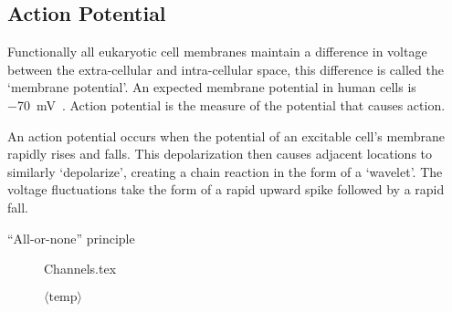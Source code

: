 \documentclass[../../Orator]{subfiles}
\begin{document}
\endgroup

\subsection{Action Potential}

Functionally all eukaryotic cell membranes maintain a difference in voltage between the extra-cellular and intra-cellular space, this difference is called the `membrane potential'. An expected membrane potential in human cells is \qty{-70}{\milli\volt}~\cite{}.
Action potential is the measure of the potential that causes action.

An action potential occurs when the potential of an excitable cell's membrane rapidly rises and falls. This depolarization then causes adjacent locations to similarly `depolarize', creating a chain reaction in the form of a `wavelet'.
The voltage fluctuations take the form of a rapid upward spike followed by a rapid fall.

``All-or-none'' principle

\begin{figure}[ht]
    \centering
    {Channels.tex}
    \caption{ $\langle \text{temp} \rangle$ }\label{fig:Channels}
\end{figure}
\end{document}
